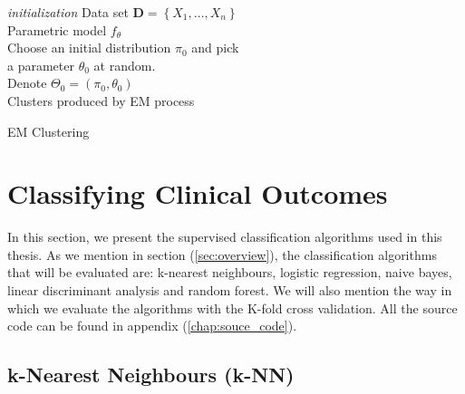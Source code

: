 \documentclass[../thesis.tex]{subfiles}
\begin{document}
\begin{algorithm}[H]{
\SetAlgoLined
\textit{initialization}\;
    \hspace*{0,5cm}Data set $\mathbf{D} = \left \{X_1, \hdots, X_n \right\}$\\
    \hspace*{0,5cm}Parametric model $f_\theta$\\
    \hspace*{0,5cm}Choose an initial distribution $\pi_0$ and pick\\ \hspace*{0,5cm}a parameter $\theta_0$ at random.\\
    \hspace*{0,5cm}Denote $\Theta_0 = (\pi_0, \theta_0)$\\
    \Return Clusters produced by EM process
}
\caption{EM Clustering}
\end{algorithm}

\section{Classifying Clinical Outcomes}
\label{sec:classify_clin_out}

\noindent In this section, we present the supervised classification algorithms used in this thesis. As we mention in section (\ref{sec:overview}), the classification algorithms that will be evaluated are: k-nearest neighbours, logistic regression, naive bayes, linear discriminant analysis and random forest. We will also mention the way in which we evaluate the algorithms with the K-fold cross validation. All the source code can be found in appendix (\ref{chap:souce_code}).

\subsection{k-Nearest Neighbours (k-NN)}
\label{subsec:knn}
\end{document}

